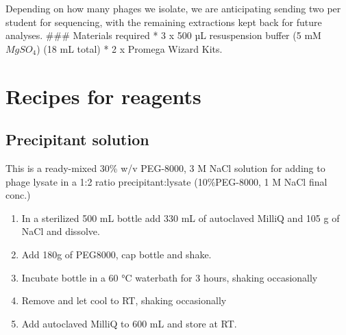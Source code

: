 \documentclass[
]{book}
\providecommand{\tightlist}{%
  \setlength{\itemsep}{0pt}\setlength{\parskip}{0pt}}
\begin{document}
Depending on how many phages we isolate, we are anticipating sending two per student for sequencing, with the remaining extractions kept back for future analyses.
\#\#\# Materials required
* 3 x 500 µL resuspension buffer (5 mM \(MgSO_{4}\)) (18 mL total)
* 2 x Promega Wizard Kits.

\hypertarget{recipes-for-reagents}{%
\chapter{Recipes for reagents}\label{recipes-for-reagents}}

\hypertarget{precipitant-solution}{%
\section{Precipitant solution}\label{precipitant-solution}}

This is a ready-mixed 30\% w/v PEG-8000, 3 M NaCl solution for adding to phage lysate in a 1:2 ratio precipitant:lysate (10\%PEG-8000, 1 M NaCl final conc.)

\begin{enumerate}
\def\labelenumi{\arabic{enumi}.}
\tightlist
\item
  In a sterilized 500 mL bottle add 330 mL of autoclaved MilliQ and 105 g of NaCl and dissolve.
\item
  Add 180g of PEG8000, cap bottle and shake.
\item
  Incubate bottle in a 60 °C waterbath for 3 hours, shaking occasionally
\item
  Remove and let cool to RT, shaking occasionally
\item
  Add autoclaved MilliQ to 600 mL and store at RT.
\end{enumerate}

  
\end{document}
